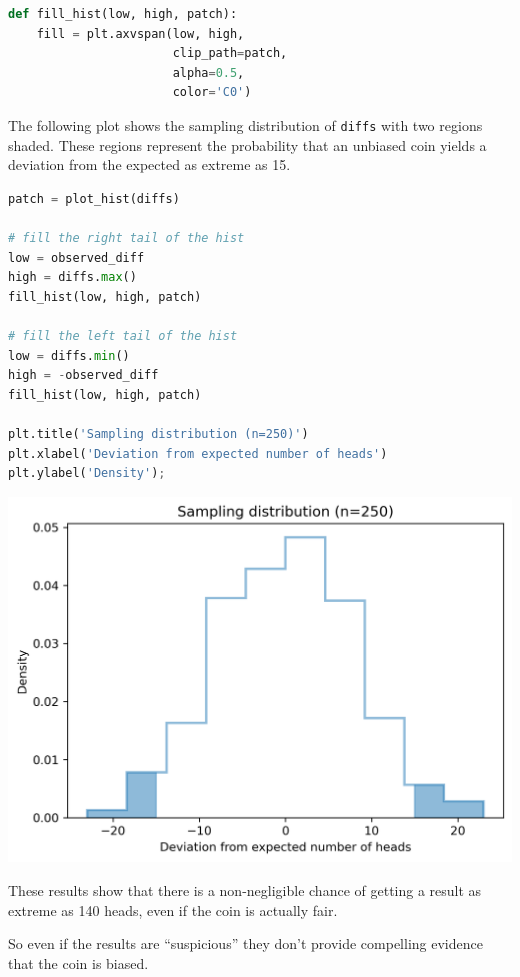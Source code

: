 \begin{lstlisting}[language=Python,style=source]
def fill_hist(low, high, patch):
    fill = plt.axvspan(low, high, 
                       clip_path=patch,
                       alpha=0.5, 
                       color='C0')
\end{lstlisting}

The following plot shows the sampling distribution of
\passthrough{\lstinline!diffs!} with two regions shaded. These regions
represent the probability that an unbiased coin yields a deviation from
the expected as extreme as 15.

\begin{lstlisting}[language=Python,style=source]
patch = plot_hist(diffs)

# fill the right tail of the hist
low = observed_diff
high = diffs.max()
fill_hist(low, high, patch)

# fill the left tail of the hist
low = diffs.min()
high = -observed_diff
fill_hist(low, high, patch)

plt.title('Sampling distribution (n=250)')
plt.xlabel('Deviation from expected number of heads')
plt.ylabel('Density');
\end{lstlisting}

\begin{center}
\includegraphics[scale=0.75]{11_inference_files/11_inference_42_0.png}
\end{center}

These results show that there is a non-negligible chance of getting a
result as extreme as 140 heads, even if the coin is actually fair.

So even if the results are ``suspicious'' they don't provide compelling
evidence that the coin is biased.

